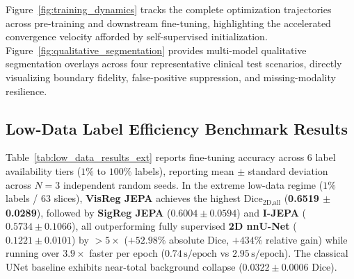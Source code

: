 \documentclass{article}
\begin{document}
Figure~\ref{fig:training_dynamics} tracks the complete optimization trajectories across pre-training and downstream fine-tuning, highlighting the accelerated convergence velocity afforded by self-supervised initialization. Figure~\ref{fig:qualitative_segmentation} provides multi-model qualitative segmentation overlays across four representative clinical test scenarios, directly visualizing boundary fidelity, false-positive suppression, and missing-modality resilience.

\subsection{Low-Data Label Efficiency Benchmark Results}

Table~\ref{tab:low_data_results_ext} reports fine-tuning accuracy across 6 label availability tiers ($1\%$ to $100\%$ labels), reporting mean $\pm$ standard deviation across $N=3$ independent random seeds. In the extreme low-data regime ($1\%$ labels / $63$ slices), \textbf{VisReg JEPA} achieves the highest $\text{Dice}_{\text{2D,all}}$ (\textbf{0.6519 $\pm$ 0.0289}), followed by \textbf{SigReg JEPA} ($0.6004 \pm 0.0594$) and \textbf{I-JEPA} ($0.5734 \pm 0.1066$), all outperforming fully supervised \textbf{2D nnU-Net} ($0.1221 \pm 0.0101$) by $>5\times$ ($+52.98\%$ absolute Dice, $+434\%$ relative gain) while running over $3.9\times$ faster per epoch ($0.74\,\text{s/epoch}$ vs $2.95\,\text{s/epoch}$). The classical UNet baseline exhibits near-total background collapse ($0.0322 \pm 0.0006$ Dice).
\end{document}
